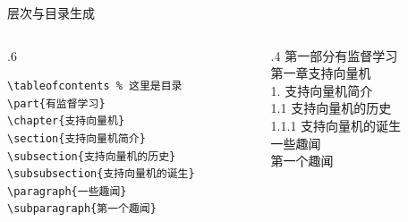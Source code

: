 
\begin{frame}[fragile]{层次与目录生成}
  \begin{columns}
    \begin{column}{.6\textwidth}

      \begin{lstlisting}[basicstyle=\ttfamily\small,morekeywords={
        tableofcontents, part, chapter, section, subsection, subsubsection,
        paragraph, subparagraph}]
\tableofcontents % 这里是目录
\part{有监督学习}
\chapter{支持向量机}
\section{支持向量机简介}
\subsection{支持向量机的历史}
\subsubsection{支持向量机的诞生}
\paragraph{一些趣闻}
\subparagraph{第一个趣闻}
\end{lstlisting}
    \end{column}
    \begin{column}{.4\textwidth}
      第一部分\quad 有监督学习\\
      第一章\quad 支持向量机 \\
      1. 支持向量机简介 \\
      1.1 支持向量机的历史 \\
      1.1.1 支持向量机的诞生 \\
      一些趣闻  \\
      第一个趣闻
    \end{column}
  \end{columns}

\end{frame}

